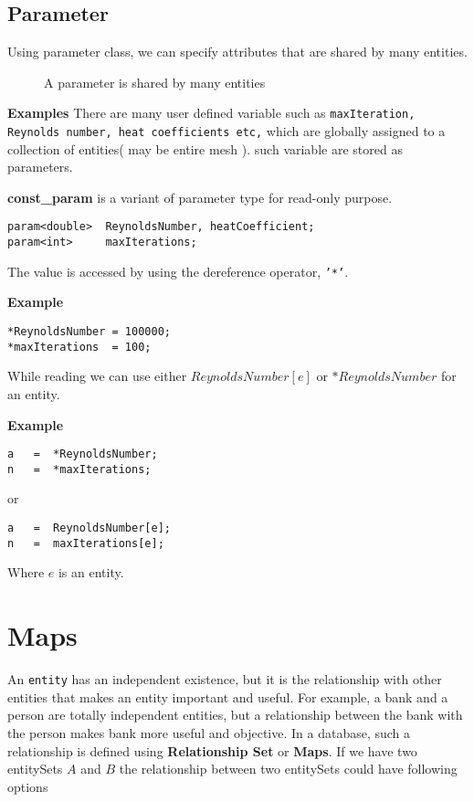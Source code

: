 \subsection{Parameter}
Using parameter class, we can specify attributes that are shared by many entities.
%
\begin{figure}[h]
\vspace{1.8in}\caption { A parameter is shared by many entities }
\label{FigParameter}
\end{figure}
%
\par {\bf Examples } There are many user defined variable such as {\tt maxIteration,
Reynolds number, heat coefficients etc,} which are globally assigned to a collection
of entities( may be entire mesh ). such variable are stored as parameters.
\par {\bf const\_param } is a variant of parameter type for read-only purpose.
\begin{verbatim}
param<double>  ReynoldsNumber, heatCoefficient;
param<int>     maxIterations;
\end{verbatim}
The value is accessed by using the dereference operator, {\tt'*'}.
\par {\bf Example }
\begin{verbatim}
*ReynoldsNumber = 100000;
*maxIterations  = 100;
\end{verbatim}

\par While reading we can use either $ReynoldsNumber[e]$ or $*ReynoldsNumber$ for an entity.
\par {\bf Example }
\begin{verbatim}
a   =  *ReynoldsNumber;
n   =  *maxIterations;
\end{verbatim}
or
\begin{verbatim}
a   =  ReynoldsNumber[e];
n   =  maxIterations[e];
\end{verbatim}
\par Where $e$ is an entity.
\section  { Maps }
An {\tt entity} has an independent existence, but it is the relationship 
with other entities that makes an entity important and useful. For example,
a bank and a person are totally independent entities, but a relationship between
the bank with the person makes bank more useful and objective. In a database,
such a relationship is defined using {\bf Relationship Set} or {\bf Maps}. 
If we have two entitySets $A$ and $B$ the relationship between two entitySets
could have following options

